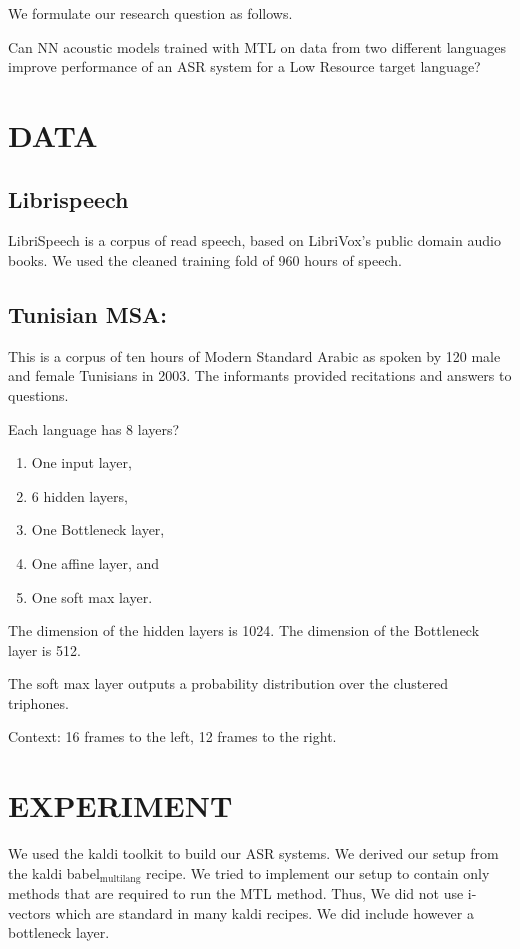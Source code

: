 \documentclass[11pt]{article}
\begin{document}
We formulate our research question as follows.

Can NN acoustic models trained with MTL on data  from  two different languages improve performance of an  ASR system for a Low Resource target language?

\section{DATA}
\label{sec-3}
\subsection{Librispeech}
\label{sec-3-1}
LibriSpeech is a corpus of read speech, based on LibriVox's public domain audio books. 
We used the cleaned training fold of 960 hours of speech. 

\subsection{Tunisian MSA:}
\label{sec-3-2}
This is a corpus of ten hours of Modern Standard Arabic as spoken by 120 male and female Tunisians in 2003. 
The informants provided recitations and answers to questions. 



Each language has 8 layers?

\begin{enumerate}
\item One input layer,
\item 6 hidden layers,
\item One Bottleneck layer,
\item One affine layer, and
\item One soft max layer.
\end{enumerate}

The dimension of the hidden layers is 1024.
The dimension of the Bottleneck layer is 512.

The soft max layer outputs a probability distribution over the clustered triphones.

Context:
16 frames to the left, 12 frames to the right.

\section{EXPERIMENT}
\label{sec-4}
We used the kaldi toolkit to build our ASR systems. 
We derived our setup from the kaldi babel$_{\text{multilang}}$ recipe. 
We tried to implement our setup to contain only methods that are required to run the MTL method. 
Thus, We did not use i-vectors which are standard in many kaldi recipes. 
We did include however a bottleneck layer. 
\end{document}
